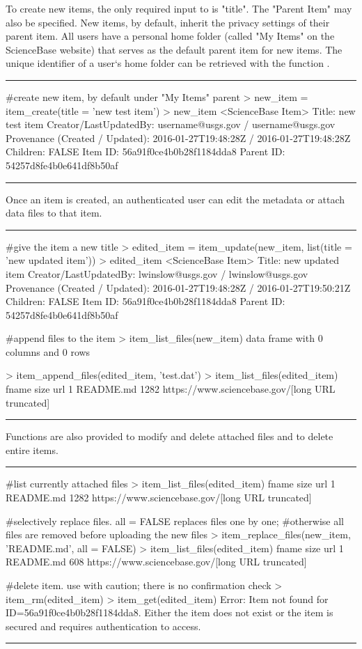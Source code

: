 To create new items, the only required input to  is "title".
The "Parent Item" may also be specified. New items, by default, inherit the privacy 
settings of their parent item. All users have a personal home folder
(called "My Items" on the ScienceBase website) that serves as the default parent
item for new items. The unique identifier of a user`s home folder can be
retrieved with the function .

\noindent\rule{\textwidth}{0.4pt}
\begin{example}
#create new item, by default under "My Items" parent
> new_item = item_create(title = 'new test item')
> new_item
<ScienceBase Item>
  Title: new test item
  Creator/LastUpdatedBy:     username@usgs.gov / username@usgs.gov
  Provenance (Created / Updated):  2016-01-27T19:48:28Z / 2016-01-27T19:48:28Z
  Children: FALSE
  Item ID: 56a91f0ce4b0b28f1184dda8
  Parent ID: 54257d8fe4b0e641df8b50af
\end{example}
\noindent\rule{\textwidth}{0.4pt}

Once an item is created, an authenticated user can edit the metadata or attach
data files to that item.

\noindent\rule{\textwidth}{0.4pt}
\begin{example}
#give the item a new title
> edited_item = item_update(new_item, list(title = 'new updated item'))
> edited_item
<ScienceBase Item>
  Title: new updated item
  Creator/LastUpdatedBy:     lwinslow@usgs.gov / lwinslow@usgs.gov
  Provenance (Created / Updated):  2016-01-27T19:48:28Z / 2016-01-27T19:50:21Z
  Children: FALSE
  Item ID: 56a91f0ce4b0b28f1184dda8
  Parent ID: 54257d8fe4b0e641df8b50af

#append files to the item
> item_list_files(new_item)
data frame with 0 columns and 0 rows

> item_append_files(edited_item, 'test.dat')
> item_list_files(edited_item)
      fname size     url
1 README.md 1282     https://www.sciencebase.gov/[long URL truncated]
\end{example}
\noindent\rule{\textwidth}{0.4pt}

Functions are also provided to modify and delete attached files and to delete
entire items.

\noindent\rule{\textwidth}{0.4pt}
\begin{example}
#list currently attached files
> item_list_files(edited_item)
      fname size     url
1 README.md 1282     https://www.sciencebase.gov/[long URL truncated]

#selectively replace files. all = FALSE replaces files one by one;
#otherwise all files are removed before uploading the new files
> item_replace_files(new_item, 'README.md', all = FALSE)
> item_list_files(edited_item)
      fname size     url
1 README.md 608     https://www.sciencebase.gov/[long URL truncated]

#delete item. use with caution; there is no confirmation check
> item_rm(edited_item)
> item_get(edited_item)
Error: Item not found for ID=56a91f0ce4b0b28f1184dda8. Either the item does
not exist or the item is secured and requires authentication to access.
\end{example}
\noindent\rule{\textwidth}{0.4pt}

